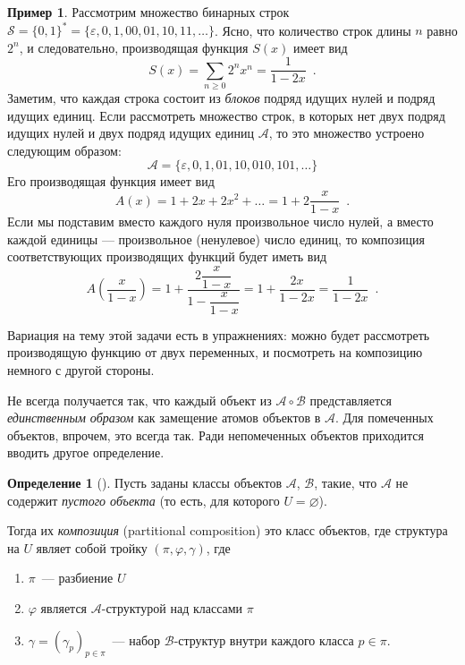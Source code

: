 \documentclass{article}
\theoremstyle{definition}
\newtheorem{example}{Пример}
\newtheorem*{definition}{Определение}
\begin{document}
\begin{example}
	Рассмотрим множество бинарных строк \( \mathcal S = \{0, 1\}^{\ast} = \{ 
	\varepsilon, 0, 1, 00, 01, 10, 11, \ldots \} \). Ясно, что количество строк 
	длины \( n \) равно \( 2^n \), и следовательно, производящая функция \( 
	S(x) \) имеет вид
	\[
		S(x) = \sum_{n \geq 0} 2^n x^n = \dfrac{1}{1 - 2x}	 \enspace .
	\]
	Заметим, что каждая строка 
	состоит из \textit{блоков} подряд идущих нулей и подряд идущих единиц. Если 
	рассмотреть множество строк, в которых нет двух подряд идущих нулей и двух 
	подряд идущих единиц \( \mathcal A \), то это множество устроено следующим 
	образом:
	\[
		\mathcal A = \{ \varepsilon, 0, 1, 01, 10, 010, 101, \ldots \}
	\]
	Его производящая функция имеет вид
	\[
		A(x) = 1 + 2x + 2x^2 + \ldots = 1 + 2\dfrac{x}{1 - x} \enspace .
	\]
	Если мы подставим вместо каждого нуля произвольное число нулей, а вместо 
	каждой единицы --- произвольное (ненулевое) число единиц, то композиция 
	соответствующих производящих функций будет иметь вид
	\[
		A\left( \dfrac{x}{1 - x}\right) = 1 + \dfrac{2\dfrac{x}{1- x}}{1 - 
		\dfrac{x}{1 - x}} = 1 + \dfrac{2x}{1 - 2x} = \dfrac{1}{1 - 2x} \enspace 
		.
	\]
\end{example}

Вариация на тему этой задачи есть в упражнениях: можно будет рассмотреть 
производящую функцию от двух переменных, и посмотреть на композицию немного с 
другой стороны.

Не всегда получается так, что каждый объект из \( \mathcal A \circ \mathcal B 
\) представляется 
\textit{единственным образом} как замещение атомов объектов в \( \mathcal A \). 
Для помеченных объектов, впрочем, это всегда так. Ради непомеченных объектов  
приходится вводить другое определение.

\begin{definition}[{\cite[p.43]{species}}]
	Пусть заданы классы объектов \( \mathcal A \), \( \mathcal B \), такие, что 
	\( \mathcal A \) не содержит \textit{пустого объекта} (то есть, для 
	которого 
	\( U = \varnothing \)). 
	
	 Тогда их \textit{композиция} (partitional composition) это класс объектов, 
	 где 
	 структура на \( U \) являет собой тройку \( (\pi, \varphi, \gamma) \), где
	\begin{enumerate}
		\item \( \pi \)~--- разбиение \( U \)
		\item \( \varphi \) является \( \mathcal A \)-структурой над классами 
		\( \pi \)
		\item \( \gamma = (\gamma_p)_{p \in \pi} \)~--- набор \( 
		\mathcal B \)-структур внутри каждого класса \( p \in \pi \).
	\end{enumerate}
\end{definition}
\end{document}

